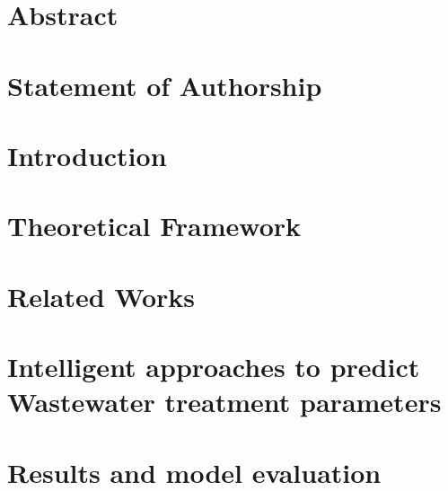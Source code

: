 \documentclass[twoside,openright,titlepage,numbers=noenddot,headinclude,footinclude=true,cleardoublepage=empty,listof=totoc,paper=a4,fontsize=11pt,australian,twoside=semi,DIV=calc]{scrreprt}
\begin{document}
  \frenchspacing
  \raggedbottom
  
  \pagestyle{plain}
  
  
  \singlespacing
  
  
  
  \onehalfspacing
  
  
  \chapter*{Abstract}
  
  
  \chapter*{Statement of Authorship}
  
  
  
  
  
  \cleardoublepage
  \pagestyle{scrheadings}
  \onehalfspacing
  
  \chapter{Introduction}\label{c:Introduction}
  
  
  \chapter{Theoretical Framework}\label{c:Background}
  
  
  \chapter{Related Works}\label{c:Related-Works}
  
  
  \chapter{Intelligent approaches to predict Wastewater treatment parameters}\label{c:Contribution-1}
  
  
  \chapter{Results and model evaluation}\label{c:Contribution-2}
  
\end{document}
